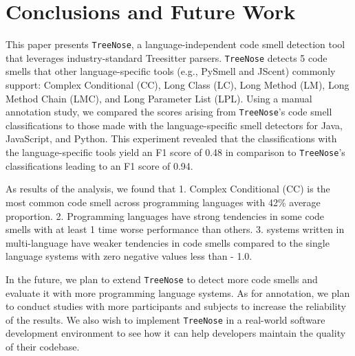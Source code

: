 \section{Conclusions and Future Work}





This paper presents \texttt{TreeNose}, a language-independent code smell
detection tool that leverages industry-standard Treesitter parsers.
\texttt{TreeNose} detects 5 code smells that other language-specific tools
(e.g., PySmell and JScent) commonly support: Complex Conditional (CC), Long
Class (LC), Long Method (LM), Long Method Chain (LMC), and Long Parameter List
(LPL).
%
Using a manual annotation study, we compared the scores arising from
\texttt{TreeNose}'s code smell classifications to those made with the
language-specific smell detectors for Java, JavaScript, and Python.
%
This experiment revealed that the classifications with the language-specific
tools yield an F1 score of 0.48 in comparison to \texttt{TreeNose}'s
classifications leading to an F1 score of 0.94.



%
As results of the analysis, we found that 1. Complex Conditional (CC) is the
most common code smell across programming languages with 42\% average
proportion. 2. Programming languages have strong tendencies in some code smells
with at least 1 time worse performance than others. 3. systems written in
multi-language have weaker tendencies in code smells compared to the single
language systems with zero negative values less than - 1.0.

In the future, we plan to extend \texttt{TreeNose} to detect more code smells
and evaluate it with more programming language systems. As for annotation, we
plan to conduct studies with more participants and subjects to increase the
reliability of the results. We also wish to implement \texttt{TreeNose} in a
real-world software development environment to see how it can help developers
maintain the quality of their codebase.
